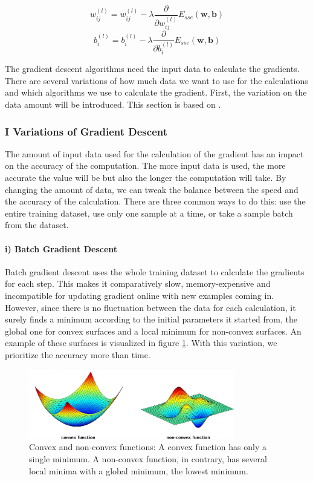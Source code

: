 	\begin{equation} \label{eq:weightUpdate} 
		w_{ij}^{(l)} = w_{ij}^{(l)} - \lambda \frac{\partial}{\partial w_{ij}^{(l)}}E_{sse}(\bm{w}, \bm{b})
	\end{equation} 
	\begin{equation} \label{eq:biasUpdate} 
		b_{i}^{(l)} = b_{i}^{(l)} - \lambda \frac{\partial}{\partial b_{i}^{(l)}}E_{sse}(\bm{w}, \bm{b})
	\end{equation} 


The gradient descent algorithms need the input data to calculate the gradients. There are several variations of how much data we want to use for the calculations and which algorithms we use to calculate the gradient. First, the variation on the data amount will be introduced. This section is based on \cite{overviewGD}.

\subsubsection*{I Variations of Gradient Descent}
The amount of input data used for the calculation of the gradient has an impact on the accuracy of the computation. The more input data is used, the more accurate the value will be but also the longer the computation will take. By changing the amount of data, we can tweak the balance between the speed and the accuracy of the calculation. There are three common ways to do this: use the entire training dataset, use only one sample at a time, or take a sample batch from the dataset. 

\paragraph*{i) Batch Gradient Descent} Batch gradient descent uses the whole training dataset to calculate the gradients for each step. This makes it comparatively slow, memory-expensive and incompatible for updating gradient online with new examples coming in. However, since there is no fluctuation between the data for each calculation, it surely finds a minimum according to the initial parameters it started from, the global one for convex surfaces and a local minimum for non-convex surfaces. An example of these surfaces is visualized in figure \ref{fig:convex}. With this variation, we prioritize the accuracy more than time.  

\begin{figure}[tbh]
  \centering
    \includegraphics[width=0.8\textwidth]{abbildungen/convex.png}
  \caption{Convex and non-convex functions: A convex function has only a single minimum. A non-convex function, in contrary, has several local minima with a global minimum, the lowest minimum.} 
  \label{fig:convex}
\end{figure}

